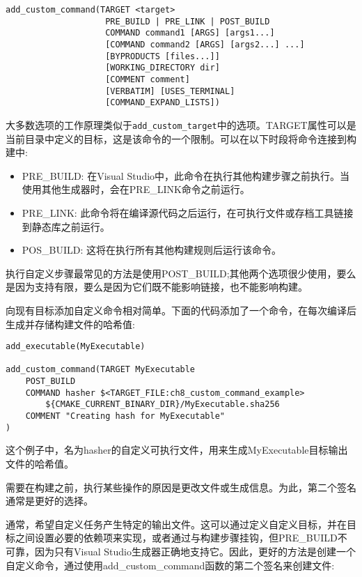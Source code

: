 \begin{lstlisting}[style=styleCMake]
add_custom_command(TARGET <target>
					PRE_BUILD | PRE_LINK | POST_BUILD
					COMMAND command1 [ARGS] [args1...]
					[COMMAND command2 [ARGS] [args2...] ...]
					[BYPRODUCTS [files...]]
					[WORKING_DIRECTORY dir]
					[COMMENT comment]
					[VERBATIM] [USES_TERMINAL]
					[COMMAND_EXPAND_LISTS])
\end{lstlisting}

大多数选项的工作原理类似于\texttt{add\_custom\_target}中的选项。TARGET属性可以是当前目录中定义的目标，这是该命令的一个限制。可以在以下时段将命令连接到构建中:

\begin{itemize}
\item 
PRE\_BUILD: 在Visual Studio中，此命令在执行其他构建步骤之前执行。当使用其他生成器时，会在PRE\_LINK命令之前运行。

\item 
PRE\_LINK: 此命令将在编译源代码之后运行，在可执行文件或存档工具链接到静态库之前运行。

\item 
POS\_BUILD: 这将在执行所有其他构建规则后运行该命令。
\end{itemize}

执行自定义步骤最常见的方法是使用POST\_BUILD;其他两个选项很少使用，要么是因为支持有限，要么是因为它们既不能影响链接，也不能影响构建。

向现有目标添加自定义命令相对简单。下面的代码添加了一个命令，在每次编译后生成并存储构建文件的哈希值:

\begin{lstlisting}[style=styleCMake]
add_executable(MyExecutable)

add_custom_command(TARGET MyExecutable
	POST_BUILD
	COMMAND hasher $<TARGET_FILE:ch8_custom_command_example>
		${CMAKE_CURRENT_BINARY_DIR}/MyExecutable.sha256
	COMMENT "Creating hash for MyExecutable"
)
\end{lstlisting}

这个例子中，名为hasher的自定义可执行文件，用来生成MyExecutable目标输出文件的哈希值。

需要在构建之前，执行某些操作的原因是更改文件或生成信息。为此，第二个签名通常是更好的选择。


通常，希望自定义任务产生特定的输出文件。这可以通过定义自定义目标，并在目标之间设置必要的依赖项来实现，或者通过与构建步骤挂钩，但PRE\_BUILD不可靠，因为只有Visual Studio生成器正确地支持它。因此，更好的方法是创建一个自定义命令，通过使用add\_custom\_command函数的第二个签名来创建文件:

